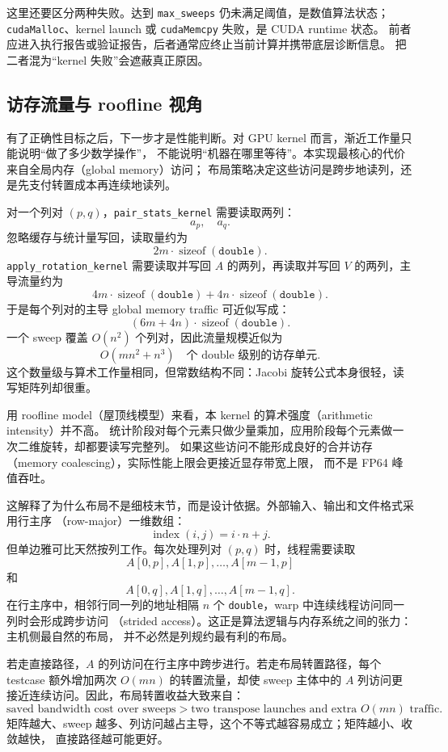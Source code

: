 这里还要区分两种失败。达到 \texttt{max\_sweeps} 仍未满足阈值，是数值算法状态；
\texttt{cudaMalloc}、kernel launch 或 \texttt{cudaMemcpy} 失败，是 CUDA runtime 状态。
前者应进入执行报告或验证报告，后者通常应终止当前计算并携带底层诊断信息。
把二者混为“kernel 失败”会遮蔽真正原因。

\subsection{访存流量与 roofline 视角}

有了正确性目标之后，下一步才是性能判断。对 GPU kernel 而言，渐近工作量只能说明“做了多少数学操作”，
不能说明“机器在哪里等待”。本实现最核心的代价来自全局内存（global memory）访问；
布局策略决定这些访问是跨步地读列，还是先支付转置成本再连续地读列。

对一个列对 \((p,q)\)，\texttt{pair\_stats\_kernel} 需要读取两列：
\[
    a_p,\quad a_q.
\]
忽略缓存与统计量写回，读取量约为
\[
    2m\cdot \operatorname{sizeof}(\texttt{double}).
\]
\texttt{apply\_rotation\_kernel} 需要读取并写回 \(A\) 的两列，再读取并写回 \(V\) 的两列，主导流量约为
\[
    4m\cdot \operatorname{sizeof}(\texttt{double})
    +
    4n\cdot \operatorname{sizeof}(\texttt{double}).
\]
于是每个列对的主导 global memory traffic 可近似写成：
\[
    (6m+4n)\cdot \operatorname{sizeof}(\texttt{double}).
\]
一个 sweep 覆盖 \(O(n^2)\) 个列对，因此流量规模近似为
\[
    O(mn^2+n^3)
    \quad\text{个 double 级别的访存单元}.
\]
这个数量级与算术工作量相同，但常数结构不同：Jacobi 旋转公式本身很轻，读写矩阵列却很重。

用 roofline model（屋顶线模型）来看，本 kernel 的算术强度（arithmetic intensity）并不高。
统计阶段对每个元素只做少量乘加，应用阶段每个元素做一次二维旋转，却都要读写完整列。
如果这些访问不能形成良好的合并访存（memory coalescing），实际性能上限会更接近显存带宽上限，
而不是 FP64 峰值吞吐。

这解释了为什么布局不是细枝末节，而是设计依据。外部输入、输出和文件格式采用行主序
（row-major）一维数组：
\[
    \operatorname{index}(i,j)=i\cdot n+j.
\]
但单边雅可比天然按列工作。每次处理列对 \((p,q)\) 时，线程需要读取
\[
    A[0,p],A[1,p],\ldots,A[m-1,p]
\]
和
\[
    A[0,q],A[1,q],\ldots,A[m-1,q].
\]
在行主序中，相邻行同一列的地址相隔 \(n\) 个 \texttt{double}，warp 中连续线程访问同一列时会形成跨步访问
（strided access）。这正是算法逻辑与内存系统之间的张力：主机侧最自然的布局，
并不必然是列规约最有利的布局。

若走直接路径，\(A\) 的列访问在行主序中跨步进行。若走布局转置路径，每个 testcase 额外增加两次
\(O(mn)\) 的转置流量，却使 sweep 主体中的 \(A\) 列访问更接近连续访问。因此，布局转置收益大致来自：
\[
    \text{saved bandwidth cost over sweeps}
    >
    \text{two transpose launches and extra } O(mn) \text{ traffic}.
\]
矩阵越大、sweep 越多、列访问越占主导，这个不等式越容易成立；矩阵越小、收敛越快，
直接路径越可能更好。

